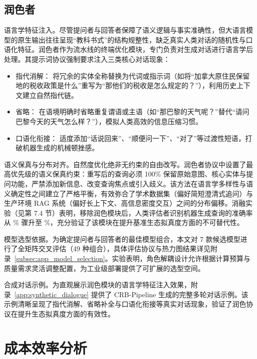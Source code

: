 \subsection{润色者}



语言学特征注入。尽管提问者与回答者保障了语义逻辑与事实准确性，但大语言模型的原生输出往往呈现“教科书式”的结构规整性，缺乏真实人类对话的随机性与口语化特征。润色者作为流水线的终端优化模块，专门负责对生成对话进行语言学后处理。其提示词协议强制要求注入三类核心对话现象：

\begin{itemize}

    \item 指代消解： 将冗余的实体全称替换为代词或指示词（如将“加拿大原住民保留地的税收政策是什么”重写为“那他们的税收是怎么规定的？”），利用历史上下文建立自然指代链。

    \item 省略： 在语境明确时省略重复谓语或主语（如“那巴黎的天气呢？”替代“请问巴黎今天的天气怎么样？”），模拟人类高效的信息压缩习惯。

    \item 口语化衔接： 适度添加“话说回来”、“顺便问一下”、“对了”等过渡性短语，打破机器生成的机械顿挫感。

\end{itemize}



语义保真与分布对齐。自然度优化绝非无约束的自由改写。润色者协议中设置了最高优先级的语义保真约束：重写后的查询必须 100\% 保留原始意图、核心实体与提问功能，严禁添加新信息、改变查询焦点或引入歧义。该方法在语言学多样性与语义确定性之间建立了严格平衡，有效弥合了学术数据集（偏好简短澄清式追问）与生产环境 RAG 系统（偏好长上下文、高信息密度交互）之间的分布偏移。消融实验（见第 7.4 节）表明，移除润色模块后，人类评估者识别机器生成查询的准确率从 \% 骤升至 \%，充分验证了该模块在提升基准生态拟真度方面的不可替代性。


模型选型依据。为确定提问者与回答者的最佳模型组合，本文对 7 款候选模型进行了全矩阵交叉评估（49 种组合），具体评估协议与热力图结果详见附录~\ref{subsec:app_model_selection}。实验表明，角色解耦设计允许根据计算预算与质量需求灵活调整配置，为工业级部署提供了可扩展的选型空间。

合成对话示例。为直观展示润色模块的语言学特征注入效果，附录~\ref{app:synthetic_dialogue} 提供了 CRB-Pipeline 生成的完整多轮对话示例。该示例清晰呈现了指代消解、省略补全与口语化衔接等真实对话现象，验证了润色协议在提升生态拟真度方面的有效性。
\section{成本效率分析}

